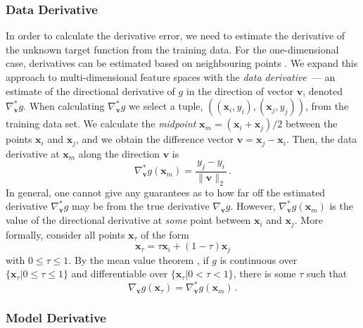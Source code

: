 \documentclass{article}
\newcommand{\kibitz}[2]{\ifnum\Comments=1\textcolor{#1}{#2}\fi}
\newcommand{\kizito}[1]{\kibitz{red} {[Kizito: #1]}}
\begin{document}
\subsubsection{Data Derivative}

In order to calculate the derivative error, we need to estimate the derivative of the unknown target function from the training data. 
For the one-dimensional case, derivatives can be estimated based on neighbouring points \cite{kis2021numerical}.
We expand this approach to multi-dimensional feature spaces with the \emph{data derivative}~--- an estimate of the directional derivative of $g$ in the direction of vector $\mathbf{v}$, denoted $\nabla^{*}_{\mathbf{v}}g$. 
When calculating  $\nabla^{*}_{\mathbf{v}}g$ we select a tuple, $((\mathbf{x}_i,y_i),(\mathbf{x}_j,y_j))$, from the training data set.
We calculate the \emph{midpoint} $\mathbf{x}_m = (\mathbf{x}_i+\mathbf{x}_j)/2$ between the points $\mathbf{x}_i$ and $\mathbf{x}_j$, and we obtain the difference vector $\mathbf{v} = \mathbf{x}_j - \mathbf{x}_i$.
Then, the data derivative at $\mathbf{x}_m$ along the direction $\mathbf{v}$ is%
\begin{equation} 
\nabla^{*}_{\mathbf{v}}g(\mathbf{x}_m) = \frac{y_j - y_i}{\|\mathbf{v}\|_2}\,.
\end{equation}
In general, one cannot give any guarantees as to how far off the estimated derivative $\nabla^{*}_{\mathbf{v}}g$ may be from the true derivative $\nabla_{\mathbf{v}}g$. 
However, $\nabla^{*}_{\mathbf{v}}g(\mathbf{x}_m)$ is the value of the directional derivative at \emph{some} point between $\mathbf{x}_{i}$ and $\mathbf{x}_{j}$. More formally, consider all points $\mathbf{x}_{\tau}$ of the form 
\begin{equation}
  \mathbf{x}_{\tau} = \tau \mathbf{x}_{i} + (1-\tau)\mathbf{x}_{j}
\end{equation} 
with $0\leq\tau\leq1$.
By the mean value theorem \cite[p 613]{rodhe-et-al-2012-introduction}, if $g$ is continuous over $\{\mathbf{x}_{\tau}|0\leq\tau\leq1\}$ and differentiable over $\{\mathbf{x}_{\tau}|0<\tau<1\}$, there is some $\tau$ such that 
\begin{equation}
 \nabla_{\mathbf{v}}g(\mathbf{x}_{\tau}) = \nabla^{*}_{\mathbf{v}}g(\mathbf{x}_m)\,.
\end{equation}



\subsubsection{Model Derivative}
\end{document}
